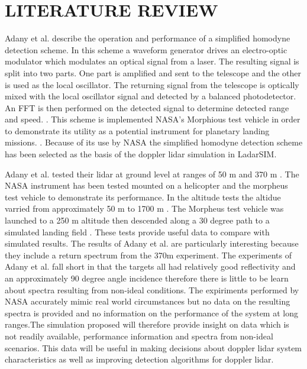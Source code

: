 %
%
%
%

\chapter{LITERATURE REVIEW}

Adany et al.
describe the operation and performance of a simplified homodyne detection
scheme.
In this scheme a waveform generator drives an electro-optic modulator which
modulates an optical signal from a laser.
The resulting signal is split into two parts.
One part is amplified and sent to the telescope and the other is used as
the local oscillator.
The returning signal from the telescope is optically mixed with the local
oscillator signal and detected by a balanced photodetector.
An FFT is then performed on the detected signal to determine detected range
and speed.
\cite{adany09}.
This scheme is implemented NASA's Morphious test vehicle in order to demonstrate
its utility as a potential instrument for planetary landing missions.
\cite{amz12,amz12p2,amz12fiber,amz16coherent}.
Because of its use by NASA the simplified homodyne detection scheme has
been selected as the basis of the doppler lidar simulation in LadarSIM.

Adany et al.
tested their lidar at ground level at ranges of 50 m and 370 m \cite{adany09}.
The NASA instrument has been tested mounted on a helicopter and the morpheus
test vehicle to demonstrate its performance.
In the altitude tests the altidue varried from approximately 50 m to 1700
m \cite{pierrottet2009flight,pierrottet2011navigation}.
The Morpheus test vehicle was launched to a 250 m altitude then descended
along a 30 degree path to a simulated landing field \cite{amz16coherent}.
These tests provide useful data to compare with simulated results.
The results of Adany et al.
are particularly interesting because they include a return spectrum from
the 370m experiment.
The experiments of Adany et al.
fall short in that the targets all had relatively good reflectivity and
an approximately 90 degree angle incidence therefore there is little to
be learn about spectra resulting from non-ideal conditions.
The expiriments performed by NASA accurately mimic real world circumstances
but no data on the resulting spectra is provided and no information on
the performance of the system at long ranges.The simulation proposed will
therefore provide insight on data which is not readily available, performance
information and spectra from non-ideal scenarios.
This data will be useful in making decisions about doppler lidar system
characteristics as well as improving detection algorithms for doppler lidar.

